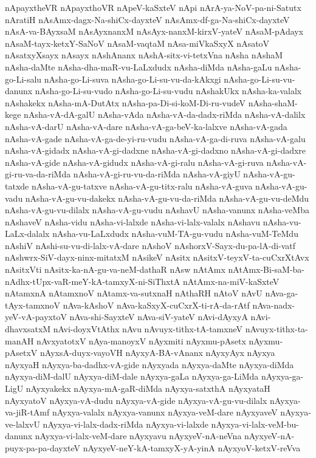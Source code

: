 {nApayxtheVR
nApayxthoVR
nApeV-kaSxteV
nApi
nArA-ya-NoV-pa-ni-Satutx
nAratiH
nAsAmx-dagx-Na-shiCx-dayxteV
nAsAmx-df-ga-Na-shiCx-dayxteV
nAsA-va-BAyxsaM
nAsAyxnanxM
nAsAyx-nanxM-kirxV-yateV
nAsaM-pAdayx
nAsaM-tayx-ketxY-SaNoV
nAsaM-vaqtaM
nAsa-miVkaSxyX
nAsatoV
nAsatxyXsayx
nAsayx
nAshAnanx
nAshA-sitx-vi-tetxVna
nAsha
nAshaM
nAsha-daMte
nAsha-dha-maR-vu-LaLxdudx
nAsha-diMda
nAsha-gaLu
nAsha-go-Li-salu
nAsha-go-Li-suva
nAsha-go-Li-su-vu-da-kAkxgi
nAsha-go-Li-su-vu-danunx
nAsha-go-Li-su-vudo
nAsha-go-Li-su-vudu
nAshakUkx
nAsha-ka-valalx
nAshakekx
nAsha-mA-DutAtx
nAsha-pa-Di-si-koM-Di-ru-vudeV
nAsha-shaM-kege
nAsha-vA-dA-galU
nAsha-vAda
nAsha-vA-da-dadx-riMda
nAsha-vA-dalilx
nAsha-vA-darU
nAsha-vA-dare
nAsha-vA-ga-beV-ka-lalxve
nAsha-vA-gada
nAsha-vA-gade
nAsha-vA-ga-de-yi-ru-vudu
nAsha-vA-ga-di-ruva
nAsha-vA-galu
nAsha-vA-gidadx
nAsha-vA-gi-dadxne
nAsha-vA-gi-dadxno
nAsha-vA-gi-dadxre
nAsha-vA-gide
nAsha-vA-gidudx
nAsha-vA-gi-ralu
nAsha-vA-gi-ruva
nAsha-vA-gi-ru-va-da-riMda
nAsha-vA-gi-ru-vu-da-riMda
nAsha-vA-giyU
nAsha-vA-gu-tatxde
nAsha-vA-gu-tatxve
nAsha-vA-gu-titx-ralu
nAsha-vA-guva
nAsha-vA-gu-vadu
nAsha-vA-gu-vu-dakekx
nAsha-vA-gu-vu-da-riMda
nAsha-vA-gu-vu-deMdu
nAsha-vA-gu-vu-dilalx
nAsha-vA-gu-vudu
nAshavU
nAsha-vanunx
nAsha-veMba
nAshaveV
nAsha-vidu
nAsha-vi-lalxde
nAsha-vi-lalx-valalx
nAshavu
nAsha-vu-LaLx-dalalx
nAsha-vu-LaLxdudx
nAsha-vuM-TA-gu-vudu
nAsha-vuM-TeMdu
nAshiV
nAshi-su-vu-di-lalx-vA-dare
nAshoV
nAshorxV-Sayx-du-pa-lA-di-vatf
nAshwrx-SiV-dayx-ninx-mitatxM
nAsikeV
nAsitx
nAsitxV-teyxV-ta-cuCxrXtAvx
nAsitxVti
nAsitx-ka-nA-gu-va-neM-dathaR
nAsw
nAtAmx
nAtAmx-Bi-saM-ba-nAdhx-tUpx-vaR-meY-kA-tamxyX-ni-SiThxtA
nAtAmx-na-miV-kaSxteV
nAtamxnA
nAtamxnoV
nAtamx-va-sutxnaH
nAthaRH
nAtoV
nAvU
nAva-ga-tAyx-tamxnoV
nAva-kAshoV
nAva-kaSxyX-cuCxrX-ti-rA-da-rAtf
nAva-nadx-yeV-vA-payxtoV
nAva-shi-SayxteV
nAva-siV-yateV
nAvi-dAyxyA
nAvi-dhavxsatxM
nAvi-doyxVtAthx
nAvu
nAvuyx-tithx-tA-tamxneV
nAvuyx-tithx-ta-manAH
nAvxyatotxV
nAya-manoyxV
nAyxmiti
nAyxmu-pAsetx
nAyxmu-pAsetxV
nAyxsA-duyx-vayoVH
nAyxyA-BA-vAnanx
nAyxyAyx
nAyxya
nAyxyaH
nAyxya-ba-dadhx-vA-gide
nAyxyada
nAyxya-daMte
nAyxya-diMda
nAyxya-diM-dalU
nAyxya-diM-dale
nAyxya-gaLa
nAyxya-ga-LiMda
nAyxya-ga-LigU
nAyxyakekx
nAyxya-mA-gaR-diMda
nAyxya-satxthA
nAyxyataH
nAyxyatoV
nAyxya-vA-dudu
nAyxya-vA-gide
nAyxya-vA-gu-vu-dilalx
nAyxya-va-jiR-tAmf
nAyxya-valalx
nAyxya-vanunx
nAyxya-veM-dare
nAyxyaveV
nAyxya-ve-lalxvU
nAyxya-vi-lalx-dadx-riMda
nAyxya-vi-lalxde
nAyxya-vi-lalx-veM-bu-danunx
nAyxya-vi-lalx-veM-dare
nAyxyavu
nAyxyeV-nA-neVna
nAyxyeV-nA-puyx-pa-pa-dayxteV
nAyxyeV-neY-kA-tamxyX-yA-yinA
nAyxyoV-ketxV-reVva
}
